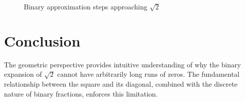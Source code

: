 \begin{figure}[H]
\centering
{}
\caption{Binary approximation steps approaching $\sqrt{2}$}
\end{figure}

\section{Conclusion}
The geometric perspective provides intuitive understanding of why the binary expansion of $\sqrt{2}$ cannot have arbitrarily long runs of zeros. The fundamental relationship between the square and its diagonal, combined with the discrete nature of binary fractions, enforces this limitation.

